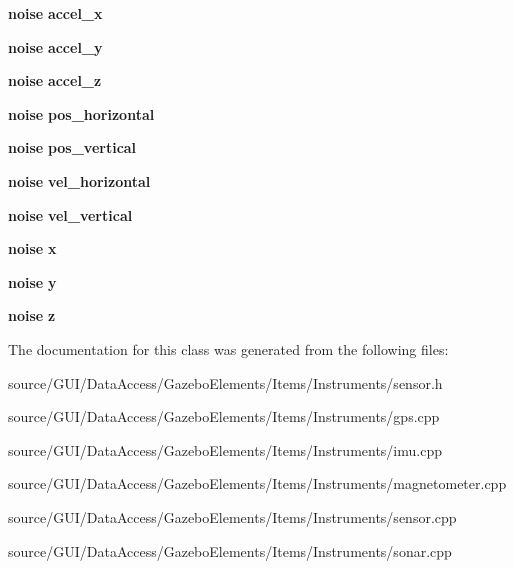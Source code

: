 \begin{DoxyCompactItemize}
\item 
{\bf noise} {\bfseries accel\+\_\+x}\label{classsensor_a9588952a89edf6413d359f8b724842d5}

\item 
{\bf noise} {\bfseries accel\+\_\+y}\label{classsensor_a5998ec95aae9b022ed4f7675d71e9b40}

\item 
{\bf noise} {\bfseries accel\+\_\+z}\label{classsensor_ac2dcf131c13c39cb8a7d75bc78063802}

\item 
{\bf noise} {\bfseries pos\+\_\+horizontal}\label{classsensor_ac7069504aeaaf33ad4b5851bb1957f90}

\item 
{\bf noise} {\bfseries pos\+\_\+vertical}\label{classsensor_aae0231f323d1d20b82f843a0bba03811}

\item 
{\bf noise} {\bfseries vel\+\_\+horizontal}\label{classsensor_aea1d208d58d4816d0bfd99ea881e25af}

\item 
{\bf noise} {\bfseries vel\+\_\+vertical}\label{classsensor_a5439d327b1a80bd26a868cd8db4b0a1a}

\item 
{\bf noise} {\bfseries x}\label{classsensor_a7047a6baebab38487ebd8ee1f129e50b}

\item 
{\bf noise} {\bfseries y}\label{classsensor_a1ad3a9b9ffa6a63825f2a2dba5afc061}

\item 
{\bf noise} {\bfseries z}\label{classsensor_a4f57572af0581ea7f03bfaf184ef7b93}

\end{DoxyCompactItemize}


The documentation for this class was generated from the following files\+:\begin{DoxyCompactItemize}
\item 
source/\+G\+U\+I/\+Data\+Access/\+Gazebo\+Elements/\+Items/\+Instruments/sensor.\+h\item 
source/\+G\+U\+I/\+Data\+Access/\+Gazebo\+Elements/\+Items/\+Instruments/gps.\+cpp\item 
source/\+G\+U\+I/\+Data\+Access/\+Gazebo\+Elements/\+Items/\+Instruments/imu.\+cpp\item 
source/\+G\+U\+I/\+Data\+Access/\+Gazebo\+Elements/\+Items/\+Instruments/magnetometer.\+cpp\item 
source/\+G\+U\+I/\+Data\+Access/\+Gazebo\+Elements/\+Items/\+Instruments/sensor.\+cpp\item 
source/\+G\+U\+I/\+Data\+Access/\+Gazebo\+Elements/\+Items/\+Instruments/sonar.\+cpp\end{DoxyCompactItemize}
